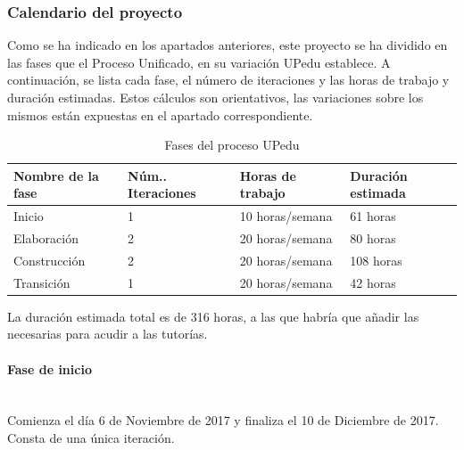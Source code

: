 \documentclass[twoside]{report}
\begin{document}
\subsubsection{Calendario del proyecto}

Como se ha indicado en los apartados anteriores, este proyecto se ha dividido en las fases que el Proceso Unificado, en su variación UPedu\cite{upedu} establece. A continuación, se lista cada fase, el número de iteraciones y las horas de trabajo y duración estimadas. Estos cálculos son orientativos, las variaciones sobre los mismos están expuestas en el apartado correspondiente.

\begin{table}[H]
\centering
\begin{tabular}{|l|l|l|l|}
\hline
Nombre de la fase & Núm.. Iteraciones & Horas de trabajo & Duración estimada \\ \hline
Inicio            & 1                 & 10 horas/semana  & 61 horas       \\ \hline
Elaboración       & 2                 & 20 horas/semana  & 80 horas    \\ \hline
Construcción      & 2                 & 20 horas/semana  & 108 horas       \\ \hline
Transición        & 1                 & 20 horas/semana   & 42 horas       \\ \hline
\end{tabular}
\caption{Fases del proceso UPedu}
\end{table}

La duración estimada total es de 316 horas, a las que habría que añadir las necesarias para acudir a las tutorías.

\paragraph{Fase de inicio}\mbox{}\\

Comienza el día 6 de Noviembre de 2017 y finaliza el 10 de Diciembre de 2017. Consta de una única iteración. 
\end{document}
